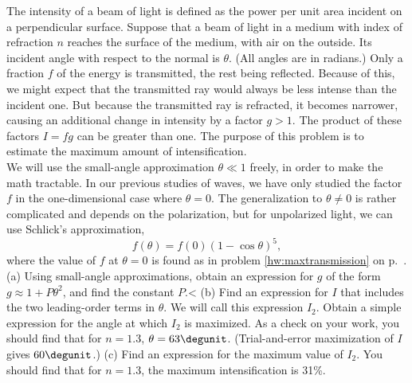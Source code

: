 The intensity of a beam of light is defined as the power per unit area
incident on a perpendicular surface. Suppose that a beam of light in a
medium with index of refraction $n$ reaches the surface of the medium,
with air on the outside. Its incident angle with respect to the normal is $\theta$.
(All angles are in radians.)
Only a fraction $f$ of the energy is
transmitted, the rest being reflected.  Because of this, we might
expect that the transmitted ray would always be less intense than the incident one. But because
the transmitted ray is refracted, it  becomes narrower, causing an additional
change in intensity by a factor $g>1$. The product of these factors $I=fg$
can be greater than one. The purpose of this problem is to estimate the maximum amount
of intensification.\\
We will use the small-angle approximation $\theta\ll 1$ freely, in order to make
the math tractable. In our previous studies of waves, we have only studied the
factor $f$ in the one-dimensional case where $\theta=0$. The generalization
to $\theta\ne0$ is rather complicated and depends on the polarization,
but for unpolarized light, we can use
Schlick's approximation, 
\begin{equation*}
  f(\theta) = f(0)(1-\cos\theta)^5,
\end{equation*}
where the value of $f$ at $\theta=0$ is found as in problem \ref{hw:maxtransmission}
on p.~\pageref{hw:maxtransmission}.\\
(a) Using small-angle approximations, obtain an expression for $g$ of the form
$g\approx 1+P\theta^2$, and find the constant $P$.<%
(b) Find an expression for $I$ that includes the two leading-order terms in $\theta$. We will
call this expression $I_2$.
Obtain a simple expression for the angle at which $I_2$ is maximized.
As a check on your work, you should find that for $n=1.3$, $\theta=63\degunit$. (Trial-and-error
maximization of $I$ gives $60\degunit$.)\hwendpart
(c) Find an expression for the maximum value of $I_2$. You should find that for
$n=1.3$, the maximum intensification is 31\%.

